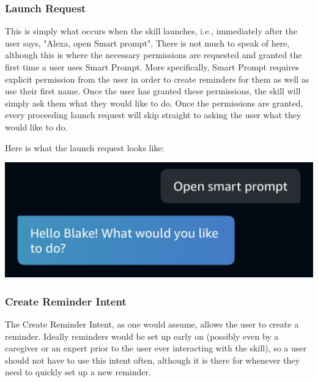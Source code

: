 \documentclass[11pt, oneside]{article}
\begin{document}
\subsubsection{Launch Request}

This is simply what occurs when the skill launches, i.e., immediately after the user says, "Alexa, open Smart prompt". 
There is not much to speak of here, although this is where the necessary permissions are requested and granted the first time a user uses Smart Prompt. 
More specifically, Smart Prompt requires explicit permission from the user in order to create reminders for them as well as use their first name. 
Once the user has granted these permissions, the skill will simply ask them what they would like to do. 
Once the permissions are granted, every proceeding launch request will skip straight to asking the user what they would like to do. 

Here is what the launch request looks like:
\begin{center}
  \includegraphics[width=\linewidth * 3/4]{images/launchRequest.jpg}
\end{center}

\subsubsection{Create Reminder Intent}

The Create Reminder Intent, as one would assume, allows the user to create a reminder. 
Ideally reminders would be set up early on (possibly even by a caregiver or an expert prior to the user ever interacting with the skill), so a user should not have to use this intent often, although it is there for whenever they need to quickly set up a new reminder. 
\end{document}

